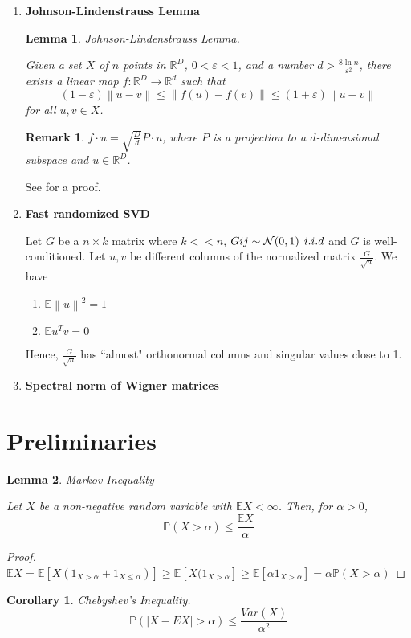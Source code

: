 \documentclass[11pt]{article}
\newtheorem{lemma}{Lemma}
\newtheorem{remark}{Remark}
\newtheorem{corollary}{Corollary}
\newcommand{\norm}[1]{\left\lVert#1\right\rVert}
\theoremstyle{definition}
\newcommand\PP{\mathbb{P}}
\newcommand\EE{\mathbb{E}}
\begin{document}
\begin{enumerate}
\item \textbf{Johnson-Lindenstrauss Lemma}
\begin{lemma}Johnson-Lindenstrauss Lemma.

Given a set $X$ of $n$ points in $\mathbb{R}^D$, $0<\varepsilon<1$, and a number $\displaystyle d>\frac{8\ln n}{\varepsilon^2}$, there exists a linear map $f:\mathbb{R}^D\to \mathbb{R}^d$ such that
$$(1-\varepsilon)\norm{u-v}\leq \norm{f(u)-f(v)}\leq (1+\varepsilon)\norm{u-v}$$
for all $u,v\in X$.
\end{lemma}

\begin{remark}
$f\cdot u=\sqrt{\frac{D}{d}}P\cdot u$, where $P$ is a projection to a $d$-dimensional subspace and $u\in \mathbb{R}^D$.
\end{remark}

See \cite{johnson} for a proof.

\item \textbf{Fast randomized SVD}

Let $G$ be a $n\times k$ matrix where $k<<n$, $G{ij}\sim \mathcal{N}(0,1) \hspace{1ex}i.i.d$ and $G$ is well-conditioned. Let $u,v$ be different columns of the normalized matrix $\frac{G}{\sqrt{n}}$. We have
\begin{enumerate}
\item $\EE\norm{u}^2=1$
\item $\EE u^Tv=0$
\end{enumerate} 
Hence, $\frac{G}{\sqrt{n}}$ has ``almost" orthonormal columns and singular values close to 1. 

\item \textbf{Spectral norm of Wigner matrices}
\end{enumerate}

\section{Preliminaries}
\begin{lemma} Markov Inequality

Let $X$ be a non-negative random variable with $\EE X<\infty$. Then, for $\alpha>0$,
$$\PP(X>\alpha)\leq \frac{\EE X}{\alpha}$$
\end{lemma}

\begin{proof}
$\EE X = \EE [X(1_{X>\alpha}+1_{X\leq\alpha})]\geq \EE[X(1_{X>\alpha}]\geq \EE [\alpha1_{X>\alpha}]=\alpha\PP(X>\alpha)$
\end{proof}
\begin{corollary}Chebyshev's Inequality.
$$\PP(|X-EX|>\alpha)\leq \frac{Var(X)}{\alpha^2}$$
\end{corollary}
\end{document}
